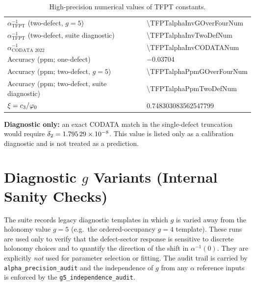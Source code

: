 \begin{table}[H]
\begin{tabular}{@{}ll@{}}
$\alpha^{-1}_{\text{TFPT}}$ (two-defect, $g=5$) & \num[round-mode=places,round-precision=12]{\TFPTalphaInvGOverFourNum}\\
$\alpha^{-1}_{\text{TFPT}}$ (two-defect, suite diagnostic) & \num[round-mode=places,round-precision=12]{\TFPTalphaInvTwoDefNum}\\
$\alpha^{-1}_{\text{CODATA 2022}}$ & \num[round-mode=places,round-precision=9]{\TFPTalphaInvCODATANum}\\
Accuracy (ppm; one-defect) & \num[round-mode=places,round-precision=6]{-0.03704}\\
Accuracy (ppm; two-defect, $g=5$) & \num[round-mode=places,round-precision=6]{\TFPTalphaPpmGOverFourNum}\\
Accuracy (ppm; two-defect, suite diagnostic) & \num[round-mode=places,round-precision=6]{\TFPTalphaPpmTwoDefNum}\\
$\xi = c_3/\varphi_0$ & \num[round-mode=places,round-precision=9]{0.748303083562547799}\\
\bottomrule
\end{tabular}
\caption{High-precision numerical values of TFPT constants.}
\label{tab:constants}
\end{table}

\begin{remark}
\textbf{Diagnostic only:} an exact CODATA match in the single-defect truncation would require
$\delta_2=\num[round-mode=figures,round-precision=6]{\TFPTdeltaTwoOptimalNum}$.
This value is listed only as a calibration diagnostic and is not treated as a prediction.
\end{remark}

\section{Diagnostic $g$ Variants (Internal Sanity Checks)}
\label{app:gdiagnostic}

The suite records legacy diagnostic templates in which $g$ is varied away from the holonomy
value $g=5$ (e.g.\ the ordered-occupancy $g=4$ template). These runs are used only to verify
that the defect-sector response is sensitive to discrete holonomy choices and to quantify the
direction of the shift in $\alpha^{-1}(0)$. They are explicitly \emph{not} used for parameter
selection or fitting. The audit trail is carried by \texttt{alpha\_precision\_audit} and the
independence of $g$ from any $\alpha$ reference inputs is enforced by the
\texttt{g5\_independence\_audit}.

